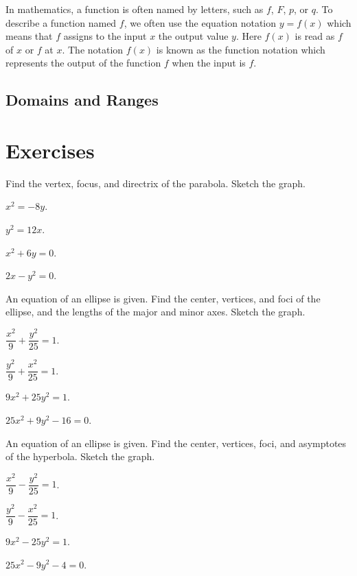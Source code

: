   In mathematics, a function is often named by letters, such as $f$, $F$, $p$, or $q$. To describe a function named $f$, we often use the equation notation $y=f(x)$ which means that $f$ assigns to the input $x$ the output value $y$. Here $f(x)$ is read as $f$ of $x$ or $f$ at $x$. The notation $f(x)$ is known as the function notation which represents the output of the function $f$ when the input is $f$. 


\subsection{Domains and Ranges}


\section*{Exercises}

\begin{exercise}
    Find the vertex, focus, and directrix of the parabola. Sketch the graph.\\
    \begin{enumerate*}
        \item $x^2=-8y$.
        \item $y^2=12x$.
        \item $x^2+6y=0$.
        \item $2x-y^2=0$.
    \end{enumerate*}
\end{exercise}
\vspace*{10\baselineskip}

\begin{exercise}
    An equation of an ellipse is given. Find the center, vertices, and foci of the ellipse, and the lengths of the major and minor axes. Sketch the graph.\\
    \begin{enumerate*}
        \item $\dfrac{x^2}{9}+\dfrac{y^2}{25}=1$.
        \item $\dfrac{y^2}{9}+\dfrac{x^2}{25}=1$.
        \item $9x^2+25y^2=1$.
        \item $25x^2+9y^2-16=0$.
    \end{enumerate*}
\end{exercise}
\vspace*{10\baselineskip}

\begin{exercise}
    An equation of an ellipse is given. Find the center, vertices, foci, and asymptotes of the hyperbola. Sketch the graph.\\
    \begin{enumerate*}
        \item $\dfrac{x^2}{9}-\dfrac{y^2}{25}=1$.
        \item $\dfrac{y^2}{9}-\dfrac{x^2}{25}=1$.
        \item $9x^2-25y^2=1$.
        \item $25x^2-9y^2-4=0$.
    \end{enumerate*}
\end{exercise}
\vspace*{10\baselineskip}


